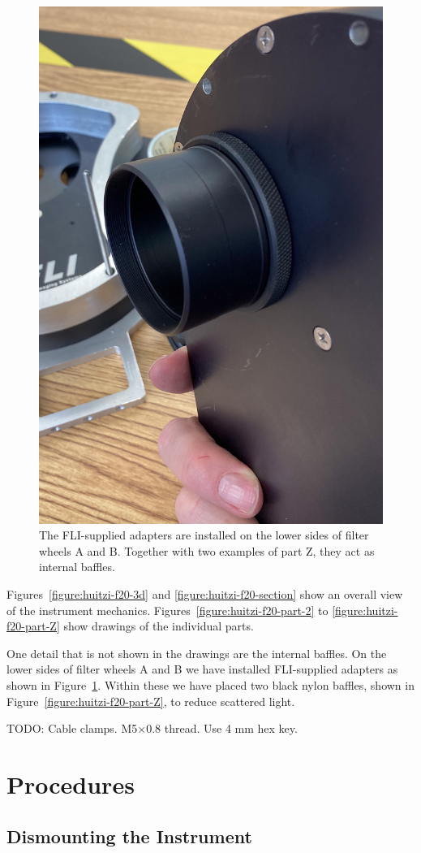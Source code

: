 \begin{figure}
\begin{center}
\includegraphics[angle=0,width=0.5\linewidth]{figures/huitzi-f20-fli-adapter.jpg}
\end{center}
\caption{The FLI-supplied adapters are installed on the lower sides of filter wheels A and B. Together with two examples of part Z, they act as internal baffles.}
\label{figure:huitzi-f20-fli-adapter}
\end{figure}

Figures~\ref{figure:huitzi-f20-3d} and \ref{figure:huitzi-f20-section} show an overall view of the instrument mechanics. Figures~\ref{figure:huitzi-f20-part-2} to \ref{figure:huitzi-f20-part-Z} show drawings of the individual parts.

One detail that is not shown in the drawings are the internal baffles. On the lower sides of filter wheels A and B we have installed FLI-supplied adapters as shown in Figure~\ref{figure:huitzi-f20-fli-adapter}. Within these we have placed two black nylon baffles, shown in Figure~\ref{figure:huitzi-f20-part-Z}, to reduce scattered light.

TODO: Cable clamps. M5×0.8 thread. Use 4 mm hex key.

\section{Procedures}

\subsection{Dismounting the Instrument}
\label{section:dismounting-the-instrument}

